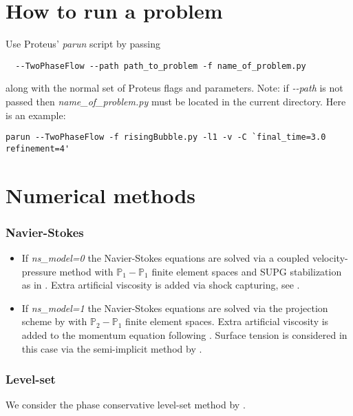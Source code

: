\documentclass[english,11pt]{article}
\let\cite=\citet
\begin{document}
\section{How to run a problem}
Use Proteus' {\it parun} script by passing
\begin{lstlisting}
  --TwoPhaseFlow --path path_to_problem -f name_of_problem.py
\end{lstlisting}
along with the normal set of Proteus flags and parameters.
Note: if {\it -{}-path} is not passed then {\it name\_of\_problem.py} must be located in the
current directory. Here is an example:
\begin{lstlisting}[frame=single]
  parun --TwoPhaseFlow -f risingBubble.py -l1 -v -C `final_time=3.0 refinement=4'
\end{lstlisting}

\section{Numerical methods}\label{sec:numerical_methods}
\subsubsection*{Navier-Stokes}
\begin{itemize}
\item If {\it ns\_model=0} the Navier-Stokes equations are solved via a coupled velocity-pressure
  method with $\mathbb{P}_1-\mathbb{P}_1$ finite element spaces and SUPG stabilization as in
  \cite{bazilevs2007variational, brooks1982streamline}.
  Extra artificial viscosity is added via shock capturing, see
  \cite{bazilevs2007yzbeta,tezduyar2007supg,tezduyar2006computation,tezduyar2006stabilization}.

\item If {\it ns\_model=1} the Navier-Stokes equations are solved via the projection scheme 
  by \cite{guermond2009splitting} with $\mathbb{P}_2-\mathbb{P}_1$ finite element spaces.
  Extra artificial viscosity is added to the momentum equation following
  \cite{guermond2011entropy,cappanera2017momentum}.
  Surface tension is considered in this case via the semi-implicit method by \cite{hysing2006new}. 
  
\end{itemize}

\subsubsection*{Level-set}
We consider the phase conservative level-set method by \cite{quezada2018monolithic}. 
\end{document}
